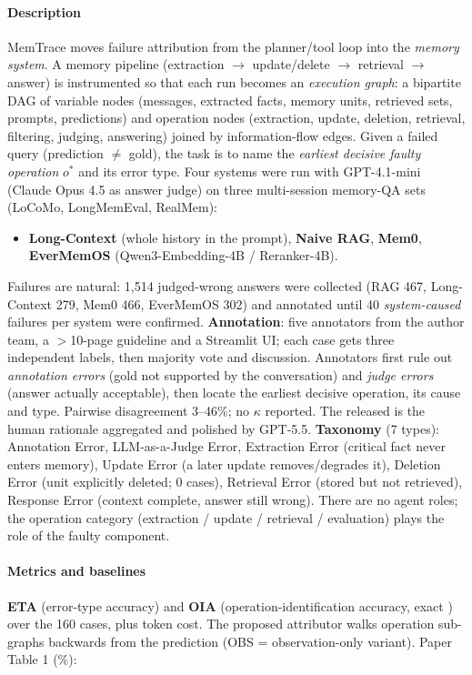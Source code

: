 \paragraph{Description} MemTrace moves failure attribution from the planner/tool loop into the \emph{memory system}. A memory pipeline (extraction $\to$ update/delete $\to$ retrieval $\to$ answer) is instrumented so that each run becomes an \emph{execution graph}: a bipartite DAG of variable nodes (messages, extracted facts, memory units, retrieved sets, prompts, predictions) and operation nodes (extraction, update, deletion, retrieval, filtering, judging, answering) joined by information-flow edges. Given a failed query (prediction $\neq$ gold), the task is to name the \emph{earliest decisive faulty operation} $o^*$ and its error type. Four systems were run with GPT-4.1-mini (Claude Opus 4.5 as answer judge) on three multi-session memory-QA sets (LoCoMo, LongMemEval, RealMem):
\begin{itemize}
\item \textbf{Long-Context} (whole history in the prompt), \textbf{Naive RAG}, \textbf{Mem0}, \textbf{EverMemOS} (Qwen3-Embedding-4B / Reranker-4B).
\end{itemize}
Failures are natural: 1,514 judged-wrong answers were collected (RAG 467, Long-Context 279, Mem0 466, EverMemOS 302) and annotated until 40 \emph{system-caused} failures per system were confirmed. \textbf{Annotation}: five annotators from the author team, a $>$10-page guideline and a Streamlit UI; each case gets three independent labels, then majority vote and discussion. Annotators first rule out \emph{annotation errors} (gold not supported by the conversation) and \emph{judge errors} (answer actually acceptable), then locate the earliest decisive operation, its cause and type. Pairwise disagreement 3--46\%; no $\kappa$ reported. The released  is the human rationale aggregated and polished by GPT-5.5. \textbf{Taxonomy} (7 types): Annotation Error, LLM-as-a-Judge Error, Extraction Error (critical fact never enters memory), Update Error (a later update removes/degrades it), Deletion Error (unit explicitly deleted; 0 cases), Retrieval Error (stored but not retrieved), Response Error (context complete, answer still wrong). There are no agent roles; the operation category (extraction / update / retrieval / evaluation) plays the role of the faulty component.

\paragraph{Metrics and baselines} \textbf{ETA} (error-type accuracy) and \textbf{OIA} (operation-identification accuracy, exact ) over the 160 cases, plus token cost. The proposed attributor walks operation sub-graphs backwards from the prediction (OBS = observation-only variant). Paper Table 1 (\%):

